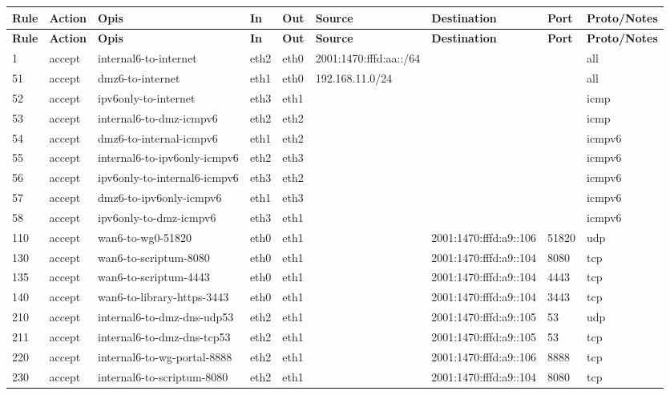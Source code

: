 \begin{longtable}{|l|l|l|l|l|l|l|p{2.2cm}|l|}
\hline
\textbf{Rule} & \textbf{Action} & \textbf{Opis} & \textbf{In} & \textbf{Out} & \textbf{Source} & \textbf{Destination} & \textbf{Port} & \textbf{Proto/Notes} \\
\hline
\endfirsthead
\hline
\textbf{Rule} & \textbf{Action} & \textbf{Opis} & \textbf{In} & \textbf{Out} & \textbf{Source} & \textbf{Destination} & \textbf{Port} & \textbf{Proto/Notes} \\
\hline
\endhead
1 & accept & internal6-to-internet & eth2 & eth0 & 2001:1470:fffd:aa::/64 &  &  & all \\
51 & accept & dmz6-to-internet & eth1 & eth0 & 192.168.11.0/24 &  &  & all \\
52 & accept & ipv6only-to-internet & eth3 & eth1 &  &  &  & icmp \\
53 & accept & internal6-to-dmz-icmpv6 & eth2 & eth2 &  &  &  & icmp \\
54 & accept & dmz6-to-internal-icmpv6 & eth1 & eth2 &  &  &  & icmpv6 \\
55 & accept & internal6-to-ipv6only-icmpv6 & eth2 & eth3 &  &  &  & icmpv6 \\
56 & accept & ipv6only-to-internal6-icmpv6 & eth3 & eth2 &  &  &  & icmpv6 \\
57 & accept & dmz6-to-ipv6only-icmpv6 & eth1 & eth3 &  &  &  & icmpv6 \\
58 & accept & ipv6only-to-dmz-icmpv6 & eth3 & eth1 &  &  &  & icmpv6 \\
110 & accept & wan6-to-wg0-51820 & eth0 & eth1 &  & 2001:1470:fffd:a9::106 & 51820 & udp \\
130 & accept & wan6-to-scriptum-8080 & eth0 & eth1 &  & 2001:1470:fffd:a9::104 & 8080 & tcp \\
135 & accept & wan6-to-scriptum-4443 & eth0 & eth1 &  & 2001:1470:fffd:a9::104 & 4443 & tcp \\
140 & accept & wan6-to-library-https-3443 & eth0 & eth1 &  & 2001:1470:fffd:a9::104 & 3443 & tcp \\
210 & accept & internal6-to-dmz-dns-udp53 & eth2 & eth1 &  & 2001:1470:fffd:a9::105 & 53 & udp \\
211 & accept & internal6-to-dmz-dns-tcp53 & eth2 & eth1 &  & 2001:1470:fffd:a9::105 & 53 & tcp \\
220 & accept & internal6-to-wg-portal-8888 & eth2 & eth1 &  & 2001:1470:fffd:a9::106 & 8888 & tcp \\
230 & accept & internal6-to-scriptum-8080 & eth2 & eth1 &  & 2001:1470:fffd:a9::104 & 8080 & tcp \\

\end{longtable}
